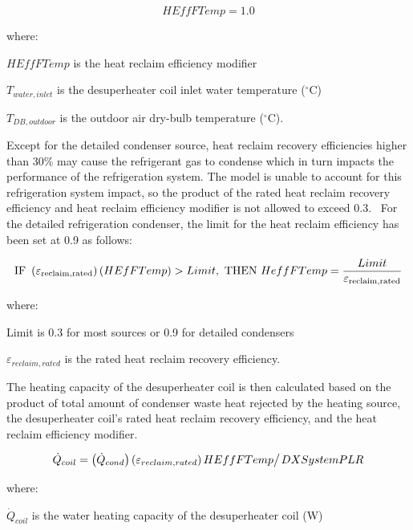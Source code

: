 \begin{equation}
  HEffFTemp = 1.0
\end{equation}

where:

\(HEffFTemp\) is the heat reclaim efficiency modifier

\({T_{water,inlet}}\) is the desuperheater coil inlet water temperature (\(^{\circ}\)C)

\({T_{DB,outdoor}}\) is the outdoor air dry-bulb temperature (\(^{\circ}\)C).

Except for the detailed condenser source, heat reclaim recovery efficiencies higher than 30\% may cause the refrigerant gas to condense which in turn impacts the performance of the refrigeration system. The model is unable to account for this refrigeration system impact, so the product of the rated heat reclaim recovery efficiency and heat reclaim efficiency modifier is not allowed to exceed 0.3.~ For the detailed refrigeration condenser, the limit for the heat reclaim efficiency has been set at 0.9 as follows:

\begin{equation}
{\rm{IF~}}\left( {{\varepsilon_{{\rm{reclaim,rated}}}}} \right)\left( {HEfFTemp} \right) > Limit,{\rm{~THEN~}}HeffFTemp = \frac{{Limit}}{{{\varepsilon_{{\rm{reclaim,rated}}}}}}
\end{equation}

where:

Limit is 0.3 for most sources or 0.9 for detailed condensers

\({\varepsilon_{reclaim,rated}}\) is the rated heat reclaim recovery efficiency.

The heating capacity of the desuperheater coil is then calculated based on the product of total amount of condenser waste heat rejected by the heating source, the desuperheater coil's rated heat reclaim recovery efficiency, and the heat reclaim efficiency modifier.

\begin{equation}
{\dot Q_{coil}} = {{\left( {{{\dot Q}_{cond}}} \right)\left( {{\varepsilon_{reclaim,rated}}} \right)HEffFTemp} \mathord{\left/ {\vphantom {{\left( {{{\dot Q}_{cond}}} \right)\left( {{\varepsilon_{reclaim,rated}}} \right)HEffFTemp} {DXSystemPLR}}} \right. } {DXSystemPLR}}
\end{equation}

where:

\({\dot Q_{coil}}\) is the water heating capacity of the desuperheater coil (W)

